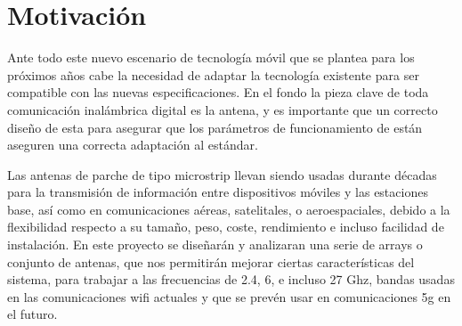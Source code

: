 \section{Motivación}
\par Ante todo este nuevo escenario de tecnología móvil que se plantea para los próximos años cabe la necesidad de adaptar la tecnología existente para ser compatible con las nuevas especificaciones. En el fondo la pieza clave de toda comunicación inalámbrica digital es la antena, y es importante que un correcto diseño de esta para asegurar que los parámetros de funcionamiento de están aseguren una correcta adaptación al estándar. 
\\
\par Las antenas de parche de tipo microstrip llevan siendo usadas durante décadas para la transmisión de información entre dispositivos móviles y las estaciones base, así como en comunicaciones aéreas, satelitales, o aeroespaciales, debido a la flexibilidad respecto a su tamaño, peso, coste, rendimiento e incluso facilidad de instalación. En este proyecto se diseñarán y analizaran una serie de arrays o conjunto de antenas, que nos permitirán mejorar ciertas características del sistema, para trabajar a las frecuencias de 2.4, 6, e incluso 27 Ghz, bandas usadas en las comunicaciones \gls{wifi} actuales y que se prevén usar en comunicaciones \gls{5g} en el futuro. 


